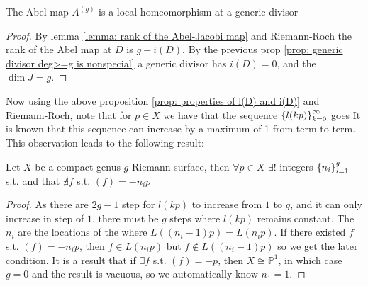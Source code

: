 \documentclass{article}
\begin{document}
\begin{corollary}\label{cor: A^g is a local homeo}
The Abel map $A^{(g)}$ is a local homeomorphism at a generic divisor	
\end{corollary}
\begin{proof}
	By lemma \ref{lemma: rank of the Abel-Jacobi map} and Riemann-Roch the rank of the Abel map at $D$ is $g-i(D)$. By the previous prop \ref{prop: generic divisor deg>=g is nonspecial} a generic divisor has $i(D)=0$, and the $\dim J=g$.  
\end{proof}
Now using the above proposition \ref{prop: properties of l(D) and i(D)} and Riemann-Roch, note that for $p \in X$ we have that the sequence $\left\{ l(kp) \right\}_{k=0}^\infty$ goes 
It is known that this sequence can increase by a maximum of 1 from term to term. This observation leads to the following result:
\begin{theorem}
	Let $X$ be a compact genus-$g$ Riemann surface, then $\forall p \in X$ $\exists!$ integers $\left\{ n_i \right\}_{i=1}^g$ s.t. 
	and that $\nexists f$ s.t. $(f)=-n_ip$
\end{theorem}
\begin{proof}
	As there are $2g-1$ step for $l(kp)$ to increase from $1$ to $g$, and it can only increase in step of $1$, there must be $g$ steps where $l(kp)$ remains constant. The $n_i$ are the locations of the  where $L((n_i-1)p) = L(n_ip)$. If there existed $f$ s.t. $(f) = -n_i p$, then $f \in L(n_i p)$ but $f \not \in L((n_i -1)p)$ so we get the later condition. It is a result that if $\exists f$ s.t. $(f)=-p$, then $X \cong \mathbb{P}^1$, in which case $g=0$ and the result is vacuous, so we automatically know $n_1=1$. 
\end{proof}
\end{document}
